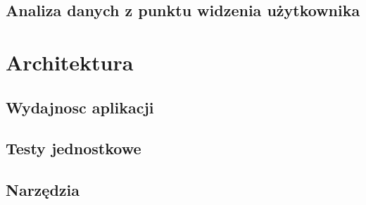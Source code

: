 \documentclass[brudnopis]{xmgr}
\begin{document}
     \section{Analiza danych z punktu widzenia użytkownika}

\chapter{Architektura}

\section{Wydajnosc aplikacji}

\section{Testy jednostkowe}

\section{Narzędzia}






\listoftables

\listoffigures

\oswiadczenie
\end{document}
